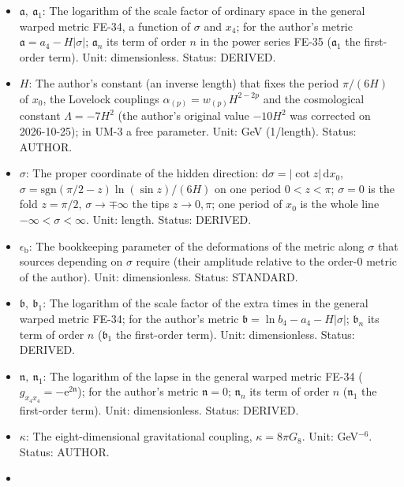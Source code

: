 \documentclass[
  10pt,
]{article}
\providecommand{\tightlist}{%
  \setlength{\itemsep}{0pt}\setlength{\parskip}{0pt}}
\begin{document}
\begin{itemize}
\tightlist
\item
  \(\mathfrak{a},\ \mathfrak{a}_1\): The logarithm of the scale factor
  of ordinary space in the general warped metric FE-34, a function of
  \(\sigma\) and \(x_4\); for the author's metric
  \(\mathfrak{a} = a_4 - H\lvert\sigma\rvert\); \(\mathfrak{a}_n\) its
  term of order \(n\) in the power series FE-35 (\(\mathfrak{a}_1\) the
  first-order term). Unit: dimensionless. Status: DERIVED.
\item
  \(H\): The author's constant (an inverse length) that fixes the period
  \(\pi/(6H)\) of \(x_0\), the Lovelock couplings
  \(\alpha_{(p)} = w_{(p)}H^{2-2p}\) and the cosmological constant
  \(\Lambda = -7H^2\) (the author's original value \(-10H^2\) was
  corrected on 2026-10-25); in UM-3 a free parameter. Unit: GeV
  (1/length). Status: AUTHOR.
\item
  \(\sigma\): The proper coordinate of the hidden direction:
  \(\mathrm{d}\sigma = \lvert\cot z\rvert\,\mathrm{d}x_0\),
  \(\sigma = \mathrm{sgn}(\pi/2 - z)\ln(\sin z)/(6H)\) on one period
  \(0 < z < \pi\); \(\sigma = 0\) is the fold \(z = \pi/2\),
  \(\sigma \to \mp\infty\) the tips \(z \to 0, \pi\); one period of
  \(x_0\) is the whole line \(-\infty < \sigma < \infty\). Unit: length.
  Status: DERIVED.
\item
  \(\epsilon_{\mathrm{b}}\): The bookkeeping parameter of the
  deformations of the metric along \(\sigma\) that sources depending on
  \(\sigma\) require (their amplitude relative to the order-0 metric of
  the author). Unit: dimensionless. Status: STANDARD.
\item
  \(\mathfrak{b},\ \mathfrak{b}_1\): The logarithm of the scale factor
  of the extra times in the general warped metric FE-34; for the
  author's metric
  \(\mathfrak{b} = \ln b_4 - a_4 - H\lvert\sigma\rvert\);
  \(\mathfrak{b}_n\) its term of order \(n\) (\(\mathfrak{b}_1\) the
  first-order term). Unit: dimensionless. Status: DERIVED.
\item
  \(\mathfrak{n},\ \mathfrak{n}_1\): The logarithm of the lapse in the
  general warped metric FE-34
  (\(g_{x_4x_4} = -\mathrm{e}^{2\mathfrak{n}}\)); for the author's
  metric \(\mathfrak{n} = 0\); \(\mathfrak{n}_n\) its term of order
  \(n\) (\(\mathfrak{n}_1\) the first-order term). Unit: dimensionless.
  Status: DERIVED.
\item
  \(\kappa\): The eight-dimensional gravitational coupling,
  \(\kappa = 8\pi G_8\). Unit: GeV\(^{-6}\). Status: AUTHOR.
\item

\end{itemize}
\end{document}
